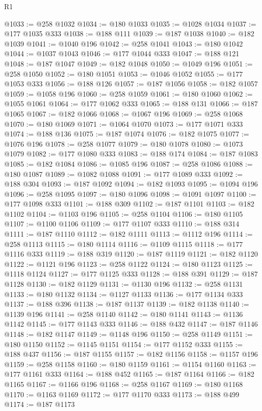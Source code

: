 \begin{lexlean}{R1}
\begin{coremodule}
@1033 := @258 @1032
@1034 := @180 @1033
@1035 := @1028 @1034
@1037 := @177 @1035 @333
@1038 := @188 @111
@1039 := @187 @1038
@1040 := @182 @1039
@1041 := @1040 @196
@1042 := @258 @1041
@1043 := @180 @1042
@1044 := @1037 @1043
@1046 := @177 @1044 @333
@1047 := @188 @121
@1048 := @187 @1047
@1049 := @182 @1048
@1050 := @1049 @196
@1051 := @258 @1050
@1052 := @180 @1051
@1053 := @1046 @1052
@1055 := @177 @1053 @333
@1056 := @188 @126
@1057 := @187 @1056
@1058 := @182 @1057
@1059 := @1058 @196
@1060 := @258 @1059
@1061 := @180 @1060
@1062 := @1055 @1061
@1064 := @177 @1062 @333
@1065 := @188 @131
@1066 := @187 @1065
@1067 := @182 @1066
@1068 := @1067 @196
@1069 := @258 @1068
@1070 := @180 @1069
@1071 := @1064 @1070
@1073 := @177 @1071 @333
@1074 := @188 @136
@1075 := @187 @1074
@1076 := @182 @1075
@1077 := @1076 @196
@1078 := @258 @1077
@1079 := @180 @1078
@1080 := @1073 @1079
@1082 := @177 @1080 @333
@1083 := @188 @174
@1084 := @187 @1083
@1085 := @182 @1084
@1086 := @1085 @196
@1087 := @258 @1086
@1088 := @180 @1087
@1089 := @1082 @1088
@1091 := @177 @1089 @333
@1092 := @188 @304
@1093 := @187 @1092
@1094 := @182 @1093
@1095 := @1094 @196
@1096 := @258 @1095
@1097 := @180 @1096
@1098 := @1091 @1097
@1100 := @177 @1098 @333
@1101 := @188 @309
@1102 := @187 @1101
@1103 := @182 @1102
@1104 := @1103 @196
@1105 := @258 @1104
@1106 := @180 @1105
@1107 := @1100 @1106
@1109 := @177 @1107 @333
@1110 := @188 @314
@1111 := @187 @1110
@1112 := @182 @1111
@1113 := @1112 @196
@1114 := @258 @1113
@1115 := @180 @1114
@1116 := @1109 @1115
@1118 := @177 @1116 @333
@1119 := @188 @319
@1120 := @187 @1119
@1121 := @182 @1120
@1122 := @1121 @196
@1123 := @258 @1122
@1124 := @180 @1123
@1125 := @1118 @1124
@1127 := @177 @1125 @333
@1128 := @188 @391
@1129 := @187 @1128
@1130 := @182 @1129
@1131 := @1130 @196
@1132 := @258 @1131
@1133 := @180 @1132
@1134 := @1127 @1133
@1136 := @177 @1134 @333
@1137 := @188 @396
@1138 := @187 @1137
@1139 := @182 @1138
@1140 := @1139 @196
@1141 := @258 @1140
@1142 := @180 @1141
@1143 := @1136 @1142
@1145 := @177 @1143 @333
@1146 := @188 @432
@1147 := @187 @1146
@1148 := @182 @1147
@1149 := @1148 @196
@1150 := @258 @1149
@1151 := @180 @1150
@1152 := @1145 @1151
@1154 := @177 @1152 @333
@1155 := @188 @437
@1156 := @187 @1155
@1157 := @182 @1156
@1158 := @1157 @196
@1159 := @258 @1158
@1160 := @180 @1159
@1161 := @1154 @1160
@1163 := @177 @1161 @333
@1164 := @188 @452
@1165 := @187 @1164
@1166 := @182 @1165
@1167 := @1166 @196
@1168 := @258 @1167
@1169 := @180 @1168
@1170 := @1163 @1169
@1172 := @177 @1170 @333
@1173 := @188 @499
@1174 := @187 @1173

\end{coremodule}
\end{lexlean}
